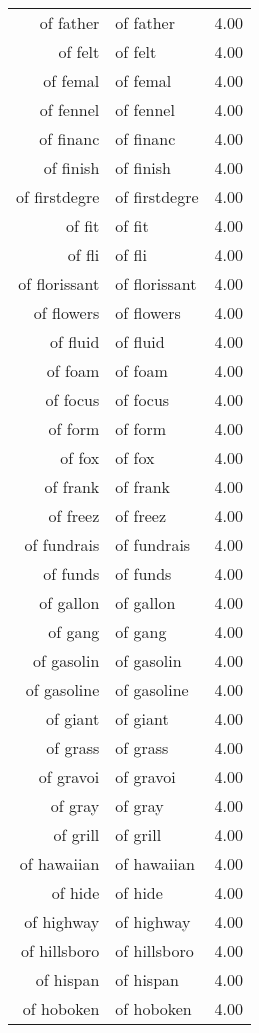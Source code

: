 \begin{table}[ht]
\begin{tabular}{rlr}
  of father & of father & 4.00 \\ 
  of felt & of felt & 4.00 \\ 
  of femal & of femal & 4.00 \\ 
  of fennel & of fennel & 4.00 \\ 
  of financ & of financ & 4.00 \\ 
  of finish & of finish & 4.00 \\ 
  of firstdegre & of firstdegre & 4.00 \\ 
  of fit & of fit & 4.00 \\ 
  of fli & of fli & 4.00 \\ 
  of florissant & of florissant & 4.00 \\ 
  of flowers & of flowers & 4.00 \\ 
  of fluid & of fluid & 4.00 \\ 
  of foam & of foam & 4.00 \\ 
  of focus & of focus & 4.00 \\ 
  of form & of form & 4.00 \\ 
  of fox & of fox & 4.00 \\ 
  of frank & of frank & 4.00 \\ 
  of freez & of freez & 4.00 \\ 
  of fundrais & of fundrais & 4.00 \\ 
  of funds & of funds & 4.00 \\ 
  of gallon & of gallon & 4.00 \\ 
  of gang & of gang & 4.00 \\ 
  of gasolin & of gasolin & 4.00 \\ 
  of gasoline & of gasoline & 4.00 \\ 
  of giant & of giant & 4.00 \\ 
  of grass & of grass & 4.00 \\ 
  of gravoi & of gravoi & 4.00 \\ 
  of gray & of gray & 4.00 \\ 
  of grill & of grill & 4.00 \\ 
  of hawaiian & of hawaiian & 4.00 \\ 
  of hide & of hide & 4.00 \\ 
  of highway & of highway & 4.00 \\ 
  of hillsboro & of hillsboro & 4.00 \\ 
  of hispan & of hispan & 4.00 \\ 
  of hoboken & of hoboken & 4.00 \\ 

\end{tabular}
\end{table}
